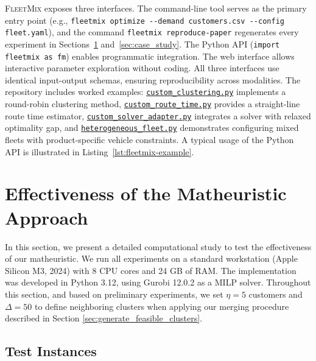 \documentclass[11pt]{elsarticle}
\theoremstyle{plain}
\newcommand{\blue}[1]{#1}
\begin{document}
\textsc{FleetMix} exposes three interfaces. The command-line tool serves as the primary entry point (e.g., \lstinline|fleetmix optimize --demand customers.csv --config fleet.yaml|), and the command \lstinline|fleetmix reproduce-paper| regenerates every experiment in Sections~\ref{sec:synthetic_results} and~\ref{sec:case_study}. The Python API (\lstinline|import fleetmix as fm|) enables programmatic integration. The web interface allows interactive parameter exploration without coding. All three interfaces use identical input-output schemas, ensuring reproducibility across modalities. The repository includes worked examples: \href{https://github.com/ekohan/fleetmix/blob/v1.1.0/examples/custom_clustering.py}{\texttt{custom\_clustering.py}} implements a round-robin clustering method, \href{https://github.com/ekohan/fleetmix/blob/v1.1.0/examples/custom_route_time.py}{\texttt{custom\_route\_time.py}} provides a straight-line route time estimator, \href{https://github.com/ekohan/fleetmix/blob/v1.1.0/examples/custom_solver_adapter.py}{\texttt{custom\_solver\_adapter.py}} integrates a solver with relaxed optimality gap, and \href{https://github.com/ekohan/fleetmix/blob/v1.1.0/examples/heterogeneous_fleet.py}{\texttt{heterogeneous\_fleet.py}} demonstrates configuring mixed fleets with product-specific vehicle constraints.
\blue{A typical usage of the Python API is illustrated in Listing~\ref{lst:fleetmix-example}.}




\section{Effectiveness of the Matheuristic Approach} \label{sec:synthetic_results}

In this section, we present a detailed computational study to test the effectiveness of our matheuristic. We run all experiments on a standard workstation (Apple Silicon M3, 2024) with 8 CPU cores and 24 GB of RAM. The implementation was developed in Python 3.12, using Gurobi 12.0.2 as a \ac{MILP} solver. Throughout this section, and based on preliminary experiments, we set $\eta = 5$ customers and $\Delta = 50$ to define neighboring clusters when applying our merging procedure described in Section \ref{sec:generate_feasible_clusters}.

\subsection{Test Instances}
\end{document}
